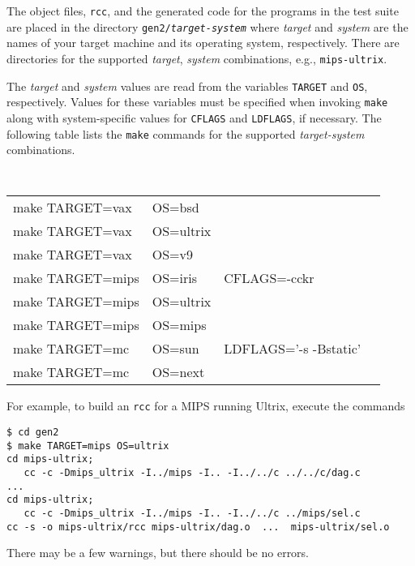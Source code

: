 The object files, \verb|rcc|, and the generated code for
the programs in the test suite are placed in the directory
{\tt gen2/\it target\/\tt-\it system\/} where {\it target\/} and {\it system\/}
are the names of your target machine and its operating system, respectively.
There are directories for the supported {\it target\/}, {\it system\/} combinations,
e.g., \verb|mips-ultrix|.

The {\it target\/} and {\it system\/} values are read from the
variables \verb|TARGET| and \verb|OS|, respectively.
Values for these variables must be specified when invoking \verb|make|
along with system-specific values for \verb|CFLAGS| and \verb|LDFLAGS|,
if necessary.
The following table lists the \verb|make| commands for the supported
{\it target\/-system\/} combinations.
\begin{center}\tt
\begin{tabular}{llll}
make TARGET=vax   & OS=bsd\\
make TARGET=vax   & OS=ultrix\\
make TARGET=vax   & OS=v9\\[1ex]

make TARGET=mips  & OS=iris	& CFLAGS=-cckr\\
make TARGET=mips  & OS=ultrix\\ 
make TARGET=mips  & OS=mips\\[1ex]


make TARGET=mc    & OS=sun	& LDFLAGS='-s -Bstatic'\\
make TARGET=mc    & OS=next\\ 
\end{tabular}
\end{center}
For example, to build an \verb|rcc| for a MIPS running Ultrix, execute the commands
\begin{verbatim}
$ cd gen2
$ make TARGET=mips OS=ultrix
cd mips-ultrix;
   cc -c -Dmips_ultrix -I../mips -I.. -I../../c ../../c/dag.c
...
cd mips-ultrix;
   cc -c -Dmips_ultrix -I../mips -I.. -I../../c ../mips/sel.c
cc -s -o mips-ultrix/rcc mips-ultrix/dag.o  ...  mips-ultrix/sel.o
\end{verbatim}
There may be a few warnings, but there should be no errors.

